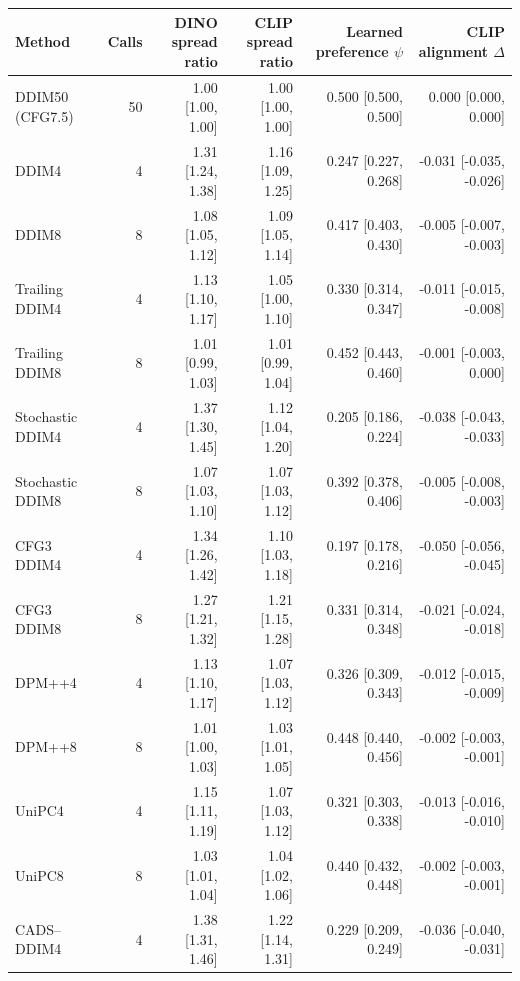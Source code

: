 \begin{table}[t]
\centering\footnotesize
\setlength{\tabcolsep}{3.5pt}
\begin{tabular}{lrrrrr}
\toprule
Method & Calls & \shortstack{DINO spread\\ratio} & \shortstack{CLIP spread\\ratio} & \shortstack{Learned preference\\$\psi$} & \shortstack{CLIP alignment\\$\Delta$} \\
\midrule
DDIM50 (CFG7.5) & 50 & 1.00 [1.00, 1.00] & 1.00 [1.00, 1.00] & 0.500 [0.500, 0.500] & 0.000 [0.000, 0.000] \\
DDIM4 & 4 & 1.31 [1.24, 1.38] & 1.16 [1.09, 1.25] & 0.247 [0.227, 0.268] & -0.031 [-0.035, -0.026] \\
DDIM8 & 8 & 1.08 [1.05, 1.12] & 1.09 [1.05, 1.14] & 0.417 [0.403, 0.430] & -0.005 [-0.007, -0.003] \\
Trailing DDIM4 & 4 & 1.13 [1.10, 1.17] & 1.05 [1.00, 1.10] & 0.330 [0.314, 0.347] & -0.011 [-0.015, -0.008] \\
Trailing DDIM8 & 8 & 1.01 [0.99, 1.03] & 1.01 [0.99, 1.04] & 0.452 [0.443, 0.460] & -0.001 [-0.003, 0.000] \\
Stochastic DDIM4 & 4 & 1.37 [1.30, 1.45] & 1.12 [1.04, 1.20] & 0.205 [0.186, 0.224] & -0.038 [-0.043, -0.033] \\
Stochastic DDIM8 & 8 & 1.07 [1.03, 1.10] & 1.07 [1.03, 1.12] & 0.392 [0.378, 0.406] & -0.005 [-0.008, -0.003] \\
CFG3 DDIM4 & 4 & 1.34 [1.26, 1.42] & 1.10 [1.03, 1.18] & 0.197 [0.178, 0.216] & -0.050 [-0.056, -0.045] \\
CFG3 DDIM8 & 8 & 1.27 [1.21, 1.32] & 1.21 [1.15, 1.28] & 0.331 [0.314, 0.348] & -0.021 [-0.024, -0.018] \\
DPM++4 & 4 & 1.13 [1.10, 1.17] & 1.07 [1.03, 1.12] & 0.326 [0.309, 0.343] & -0.012 [-0.015, -0.009] \\
DPM++8 & 8 & 1.01 [1.00, 1.03] & 1.03 [1.01, 1.05] & 0.448 [0.440, 0.456] & -0.002 [-0.003, -0.001] \\
UniPC4 & 4 & 1.15 [1.11, 1.19] & 1.07 [1.03, 1.12] & 0.321 [0.303, 0.338] & -0.013 [-0.016, -0.010] \\
UniPC8 & 8 & 1.03 [1.01, 1.04] & 1.04 [1.02, 1.06] & 0.440 [0.432, 0.448] & -0.002 [-0.003, -0.001] \\
CADS--DDIM4 & 4 & 1.38 [1.31, 1.46] & 1.22 [1.14, 1.31] & 0.229 [0.209, 0.249] & -0.036 [-0.040, -0.031] \\

\end{tabular}
\end{table}
